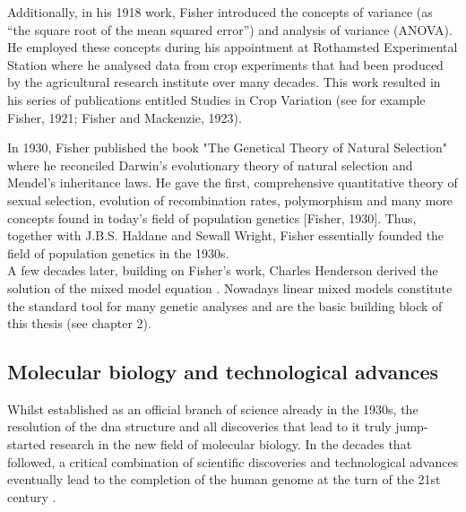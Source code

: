 Additionally, in his 1918 work, Fisher introduced the concepts of variance (as “the square root of the mean squared error”) and analysis of variance (ANOVA). 
He employed these concepts during his appointment at Rothamsted Experimental Station where he analysed data from crop experiments that had been produced by the agricultural research institute over many decades.
This work resulted in his series of publications entitled Studies in Crop Variation (see for example Fisher, 1921; Fisher and Mackenzie, 1923). 

In 1930, Fisher published the book "The Genetical Theory of Natural Selection" where he reconciled Darwin’s evolutionary theory of natural selection and Mendel’s inheritance laws. 
He gave the first, comprehensive quantitative theory of sexual selection, evolution of recombination rates, polymorphism and many more concepts found in today’s field of population genetics [Fisher, 1930]. 
Thus, together with J.B.S. Haldane and Sewall Wright, Fisher essentially founded the field of population genetics in the 1930s.\\

A few decades later, building on Fisher’s work, Charles Henderson derived the solution of the mixed model equation \cite{henderson1950estimation}. Nowadays linear mixed models constitute the standard tool for many genetic analyses and are the basic building block of this thesis (see chapter 2).

\subsection{Molecular biology and technological advances}

Whilst established as an official branch of science already in the 1930s, the resolution of the \gls{dna} structure and all discoveries that lead to it truly jump-started research in the new field of molecular biology.
In the decades that followed, a critical combination of scientific discoveries and technological advances eventually lead to the completion of the human genome at the turn of the 21st century \cite{nhgri2003genetic}.


